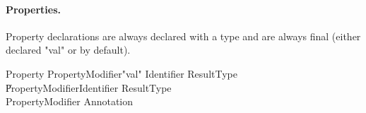\paragraph{Properties.}
Property declarations are always declared with a type and are
always final (either declared \xcd"val" or by default).

\begin{grammar}
Property
        \: PropertyModifier\star \xcd"val" Identifier ResultType \\
        \| PropertyModifier\star Identifier ResultType \\
PropertyModifier \: Annotation \\
\end{grammar}
